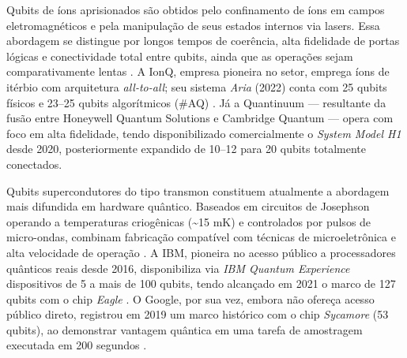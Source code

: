 Qubits de íons aprisionados são obtidos pelo confinamento de íons em campos eletromagnéticos e pela manipulação de seus estados internos via lasers. Essa abordagem se distingue por longos tempos de coerência, alta fidelidade de portas lógicas e conectividade total entre qubits, ainda que as operações sejam comparativamente lentas \cite{bruzewicz_trapped-ion_2019}. A IonQ, empresa pioneira no setor, emprega íons de itérbio com arquitetura \textit{all-to-all}; seu sistema \textit{Aria} (2022) conta com 25 qubits físicos e 23–25 qubits algorítmicos (\#AQ) \cite{ionq2022}. Já a Quantinuum — resultante da fusão entre Honeywell Quantum Solutions e Cambridge Quantum — opera com foco em alta fidelidade, tendo disponibilizado comercialmente o \textit{System Model H1} \cite{quantinuum2022} desde 2020, posteriormente expandido de 10–12 para 20 qubits totalmente conectados.

Qubits supercondutores do tipo transmon constituem atualmente a abordagem mais difundida em hardware quântico. Baseados em circuitos de Josephson operando a temperaturas criogênicas (\textasciitilde 15 mK) e controlados por pulsos de micro-ondas, combinam fabricação compatível com técnicas de microeletrônica e alta velocidade de operação \cite{koch2007charge}. A IBM, pioneira no acesso público a processadores quânticos reais desde 2016, disponibiliza via \textit{IBM Quantum Experience} dispositivos de 5 a mais de 100 qubits, tendo alcançado em 2021 o marco de 127 qubits com o chip \textit{Eagle} \cite{ibm2022quantumEagle}. O Google, por sua vez, embora não ofereça acesso público direto, registrou em 2019 um marco histórico com o chip \textit{Sycamore} (53 qubits), ao demonstrar vantagem quântica em uma tarefa de amostragem executada em 200 segundos \cite{arute_quantum_2019}.